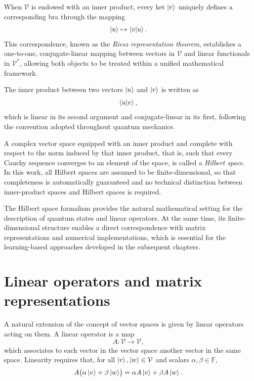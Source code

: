 When $\mathcal{V}$ is endowed with an inner product, every ket $\ket{v}$ uniquely defines a corresponding bra through the mapping
\begin{equation}
    \ket{u} \mapsto \braket{v}{u}.
\end{equation}
This correspondence, known as the \emph{Riesz representation theorem}, establishes a one-to-one, conjugate-linear mapping between vectors in $\mathcal{V}$ and linear functionals in $\mathcal{V}^\ast$, allowing both objects to be treated within a unified mathematical framework.

The inner product between two vectors $\ket{u}$ and $\ket{v}$ is written as
\begin{equation}
    \braket{u}{v},
\end{equation}
which is linear in its second argument and conjugate-linear in its first, following the convention adopted throughout quantum mechanics.

A complex vector space equipped with an inner product and complete with respect to the norm induced by that inner product, that is, such that every Cauchy sequence converges to an element of the space, is called a \emph{Hilbert space}. In this work, all Hilbert spaces are assumed to be finite-dimensional, so that completeness is automatically guaranteed and no technical distinction between inner-product spaces and Hilbert spaces is required.

The Hilbert space formalism provides the natural mathematical setting for the description of quantum states and linear operators. At the same time, its finite-dimensional structure enables a direct correspondence with matrix representations and numerical implementations, which is essential for the learning-based approaches developed in the subsequent chapters.

\section{Linear operators and matrix representations}
\label{sec:linear_operators}

A natural extension of the concept of vector spaces is given by linear operators acting on them. A linear operator is a map
\begin{equation}
    A : \mathcal{V} \to \mathcal{V},
\end{equation}
which associates to each vector in the vector space another vector in the same space. Linearity requires that, for all $\ket{v}, \ket{w} \in \mathcal{V}$ and scalars $\alpha, \beta \in \mathbb{F}$,
\begin{equation}
    A\bigl(\alpha \ket{v} + \beta \ket{w}\bigr)
    =
    \alpha A\ket{v} + \beta A\ket{w}.
\end{equation}

